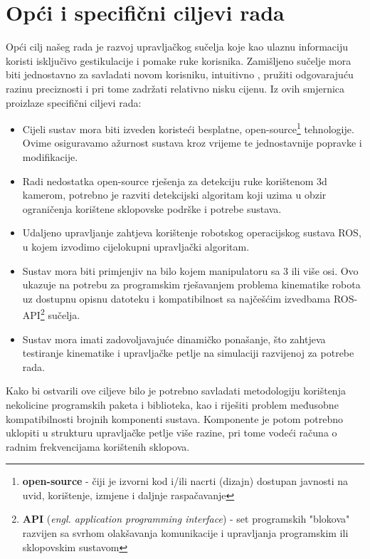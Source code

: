 \documentclass[times, utf8, diplomski, numeric]{fer}
\begin{document}
\chapter{Opći i specifični ciljevi rada}
Opći cilj našeg rada je razvoj upravljačkog sučelja koje kao ulaznu informaciju koristi isključivo gestikulacije i pomake ruke korisnika.
Zamišljeno sučelje mora biti jednostavno za savladati novom korisniku, intuitivno , pružiti odgovarajuću razinu preciznosti i pri tome zadržati relativno nisku cijenu.
Iz ovih smjernica proizlaze specifični ciljevi rada:
\begin{itemize}
\item Cijeli sustav mora biti izveden koristeći besplatne, open-source\footnote{\textbf{open-source} - čiji je izvorni kod i/ili nacrti (dizajn) dostupan javnosti na uvid, korištenje, izmjene i daljnje raspačavanje} tehnologije. 
Ovime osiguravamo ažurnost sustava kroz vrijeme te jednostavnije popravke i modifikacije.
\item Radi nedostatka open-source rješenja za detekciju ruke korištenom 3d kamerom, potrebno je razviti detekcijski algoritam koji uzima u obzir ograničenja korištene sklopovske podrške i potrebe sustava.
\item Udaljeno upravljanje zahtjeva korištenje robotskog operacijskog sustava ROS, u kojem izvodimo cijelokupni upravljački algoritam.
\item Sustav mora biti primjenjiv na bilo kojem manipulatoru sa 3 ili više osi. Ovo ukazuje na potrebu za programskim rješavanjem problema kinematike robota uz dostupnu opisnu datoteku i kompatibilnost sa najčešćim izvedbama ROS-API\footnote{\textbf{API} (\textit{engl. application programming interface}) - set programskih "blokova" razvijen sa svrhom olakšavanja komunikacije i upravljanja programskim ili sklopovskim sustavom} sučelja.
\item Sustav mora imati zadovoljavajuće dinamičko ponašanje, što zahtjeva testiranje kinematike i upravljačke petlje na simulaciji razvijenoj za potrebe rada.
\end{itemize}

Kako bi ostvarili ove ciljeve bilo je potrebno savladati metodologiju korištenja nekolicine programskih paketa i biblioteka, kao i riješiti problem međusobne kompatibilnosti brojnih komponenti sustava.
Komponente je potom potrebno uklopiti u strukturu upravljačke petlje više razine, pri tome vodeći računa o radnim frekvencijama korištenih sklopova.

\end{document}
